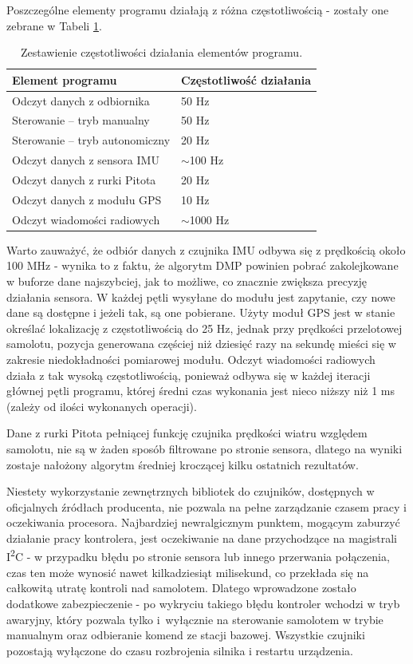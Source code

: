 \documentclass[12pt, a4paper]{article}
\begin{document}
Poszczególne elementy programu działają z różna częstotliwością - zostały one zebrane w Tabeli \ref{table:hz}.


\begin{table}[H]
\centering
\begin{tabular}{| l | l |}
\hline
\textbf{Element programu} & \textbf{Częstotliwość działania} \\
\hline
Odczyt danych z odbiornika & 50 Hz \\
\hline
Sterowanie – tryb manualny & 50 Hz \\
\hline
Sterowanie – tryb autonomiczny & 20 Hz \\
\hline
Odczyt danych z sensora IMU & $\sim$100 Hz \\
\hline
Odczyt danych z rurki Pitota & 20 Hz \\
\hline
Odczyt danych z modułu GPS & 10 Hz \\
\hline
Odczyt wiadomości radiowych & $\sim$1000 Hz \\
\hline

\end{tabular}
\caption{Zestawienie częstotliwości działania elementów programu.}
\label{table:hz}
\end{table}

Warto zauważyć, że odbiór danych z czujnika IMU odbywa się z prędkością około 100 MHz - wynika to z faktu, że algorytm DMP powinien pobrać zakolejkowane w buforze dane najszybciej, jak to możliwe, co znacznie zwiększa precyzję działania sensora. W każdej pętli wysyłane do modułu jest zapytanie, czy nowe dane są dostępne i jeżeli tak, są one pobierane. Użyty moduł GPS jest w stanie określać lokalizację z częstotliwością do 25 Hz, jednak przy prędkości przelotowej samolotu, pozycja generowana częściej niż dziesięć razy na sekundę mieści się w zakresie niedokładności pomiarowej modułu. Odczyt wiadomości radiowych działa z tak wysoką częstotliwością, ponieważ odbywa się w każdej iteracji głównej pętli programu, której średni czas wykonania jest nieco niższy niż 1 ms (zależy od ilości wykonanych operacji).

Dane z rurki Pitota pełniącej funkcję czujnika prędkości wiatru względem samolotu, nie są w żaden sposób filtrowane po stronie sensora, dlatego na wyniki zostaje nałożony algorytm średniej kroczącej kilku ostatnich rezultatów.

Niestety wykorzystanie zewnętrznych bibliotek do czujników, dostępnych w oficjalnych źródłach producenta, nie pozwala na pełne zarządzanie czasem pracy i oczekiwania procesora. Najbardziej newralgicznym punktem, mogącym zaburzyć działanie pracy kontrolera, jest oczekiwanie na dane przychodzące na magistrali I\textsuperscript{2}C - w przypadku błędu po stronie sensora lub innego przerwania połączenia, czas ten może wynosić nawet kilkadziesiąt milisekund, co przekłada się na całkowitą utratę kontroli nad samolotem. Dlatego wprowadzone zostało dodatkowe zabezpieczenie - po wykryciu takiego błędu kontroler wchodzi w tryb awaryjny, który pozwala tylko i~wyłącznie na sterowanie samolotem w trybie manualnym oraz odbieranie komend ze stacji bazowej. Wszystkie czujniki pozostają wyłączone do czasu rozbrojenia silnika i restartu urządzenia.
\end{document}
